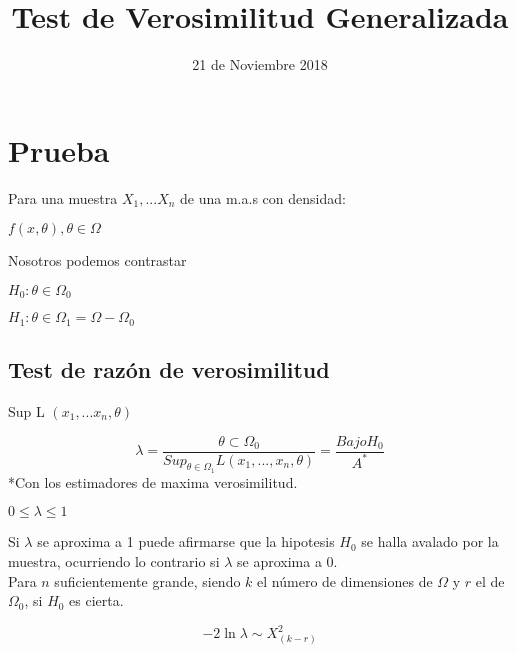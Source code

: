 \documentclass{article}
\title{Test de Verosimilitud Generalizada}
\date{21 de Noviembre 2018}
\begin{document}
\maketitle


\section{Prueba}

Para una muestra $ X_1,...X_n $  de una m.a.s con densidad:\par
\begin{center}
$f(x,\theta), \theta \in \Omega  $
\end{center} \par

\begin{flushleft}
Nosotros podemos contrastar \par

$H_0: \theta \in \Omega_0$ \par
$H_1: \theta \in \Omega_1 = \Omega - \Omega_0$\par

\end{flushleft}

\subsection{Test de razón de verosimilitud} 

Sup L $ (x_1,...x_n, \theta)$ \par

$$  \lambda =  \frac{\theta \subset \Omega_0}{Sup_{\theta \in \Omega_1} L (x_1,...,x_n, \theta)} = \frac{Bajo H_0}{  A^*}$$
*Con los estimadores de maxima verosimilitud.

$ 0 \leq \lambda \leq 1 $
\\

\begin{flushleft}
Si $ \lambda $ se aproxima a 1 puede afirmarse que la hipotesis $H_0$ se halla avalado por la muestra, ocurriendo lo contrario si $ \lambda $ se aproxima a 0. \\
Para $n$ suficientemente grande, siendo $k$ el número de dimensiones de $\Omega$ y $r$ el de $\Omega_0$, si $H_0$ es cierta. 

\end{flushleft}

$$ -2\ln\lambda \sim X_{(k-r)}^2$$
\end{document}
